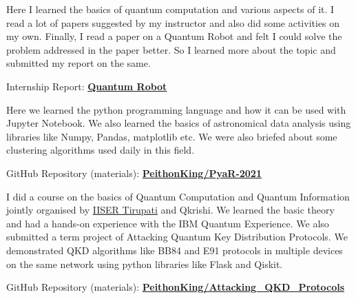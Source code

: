 

	\hspace{5mm} Here I learned the basics of quantum computation and various aspects of it. I read a lot of papers suggested by my instructor and also did some activities on my own. Finally, I read a paper on a Quantum Robot and felt I could solve the problem addressed in the paper better. So I learned more about the topic and submitted my report on the same.

	\hspace{5mm} Internship Report: \href{https://github.com/PeithonKing/Quantum_Robot_LaTEX/blob/main/quantum_robot_internship_report.pdf}{\textbf{Quantum Robot}}

	\divider



	\hspace{5mm} Here we learned the python programming language and how it can be used with Jupyter Notebook. We also learned the basics of astronomical data analysis using libraries like Numpy, Pandas, matplotlib etc. We were also briefed about some clustering algorithms used daily in this field.

	\hspace{5mm} GitHub Repository (materials): \href{https://github.com/PeithonKing/PyaR-2021}{\textbf{PeithonKing/PyaR-2021}}

	\divider



	\hspace{5mm} I did a course on the basics of Quantum Computation and Quantum Information jointly organised by \href{http://www.iisertirupati.ac.in/}{IISER Tirupati} and Qkrishi. We learned the basic theory and had a hands-on experience with the IBM Quantum Experience. We also submitted a term project of Attacking Quantum Key Distribution Protocols. We demonstrated QKD algorithms like BB84 and E91 protocols in multiple devices on the same network using python libraries like Flask and Qiskit.

	\hspace{5mm} GitHub Repository (materials): \href{https://github.com/PeithonKing/Attacking_QKD_Protocols}{\textbf{PeithonKing/Attacking\_QKD\_Protocols}}

	\divider
